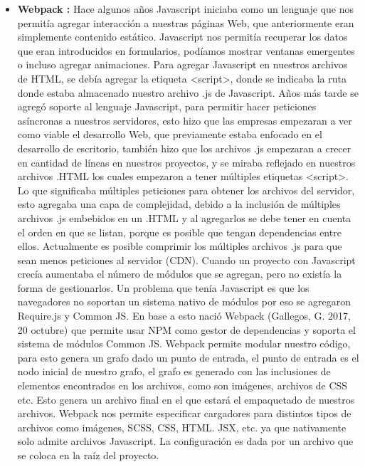 \begin{itemize}
       \item \textbf{ Webpack :} Hace algunos años Javascript iniciaba como un lenguaje que nos permitía agregar interacción a nuestras páginas Web, que anteriormente eran simplemente contenido estático.  Javascript nos permitía recuperar los datos que eran introducidos en formularios, podíamos mostrar ventanas emergentes o incluso agregar animaciones. Para agregar Javascript en nuestros archivos de HTML, se debía agregar la etiqueta <script>, donde se indicaba la ruta donde estaba almacenado nuestro archivo .js de Javascript.  
    Años más tarde se agregó soporte al lenguaje Javascript, para permitir hacer peticiones asíncronas a nuestros servidores, esto hizo que las empresas empezaran a ver como viable el desarrollo Web, que previamente estaba enfocado en el desarrollo de escritorio, también hizo que los archivos .js empezaran a crecer en cantidad de líneas en nuestros proyectos, y se miraba reflejado en nuestros archivos .HTML los cuales empezaron a tener múltiples etiquetas <script>. Lo que significaba múltiples peticiones para obtener los archivos del servidor, esto agregaba una capa de complejidad, debido a la inclusión de múltiples archivos .js embebidos en un .HTML y al agregarlos se debe tener en cuenta el orden en que se listan, porque es posible que tengan dependencias entre ellos. Actualmente es posible comprimir los múltiples archivos .js para que sean menos peticiones al servidor (CDN).  Cuando un proyecto con Javascript crecía aumentaba el número de módulos que se agregan, pero no existía la forma de gestionarlos. Un problema que tenía Javascript es que los navegadores no soportan un sistema nativo de módulos por eso se agregaron Require.js y Common JS. 
    En base a esto nació Webpack \cite{webPack} (Gallegos, G. 2017, 20 octubre) que permite usar NPM como gestor de dependencias y soporta el sistema de módulos Common JS.
    Webpack permite modular nuestro código, para esto genera un grafo dado un punto de entrada, el punto de entrada es el nodo inicial de nuestro grafo, el grafo es generado con las inclusiones de elementos encontrados en los archivos, como son imágenes, archivos de CSS etc. Esto genera un archivo final en el que estará el empaquetado de nuestros archivos. 
    Webpack nos permite especificar cargadores para distintos tipos de archivos como imágenes, SCSS, CSS, HTML. JSX, etc. ya que nativamente solo admite archivos Javascript. 
    La configuración es dada por un archivo que se coloca en la raíz del proyecto.
    

\end{itemize}
